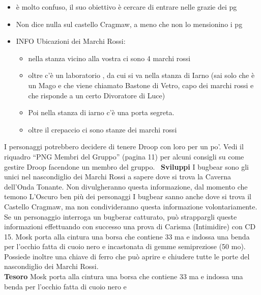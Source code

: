 \documentclass{article}
\begin{document}
        \begin{itemize}
            \item è molto confuso, il suo obiettivo è cercare di entrare nelle grazie dei pg
            \item Non dice nulla sul castello Cragmaw, a meno che non lo mensionino i pg
            \item INFO Ubicazioni dei Marchi Rossi: 
                    \begin{itemize}
                        \item nella stanza vicino alla vostra ci sono 4 marchi rossi
                        \item oltre c'è un laboratorio , da cui si va nella stanza di Iarno (sai solo che è un Mago e che viene chiamato Bastone di Vetro, capo dei marchi rossi e che risponde a un certo Divoratore di Luce)
                        \item Poi nella stanza di iarno c'è una porta segreta.
                        \item oltre il crepaccio ci sono stanze dei marchi rossi

                    \end{itemize} 
        \end{itemize}
        I personaggi potrebbero decidere di tenere Droop con
        loro per un po’. Vedi il riquadro “PNG Membri del Gruppo”
        (pagina 11) per alcuni consigli su come gestire Droop
        facendone un membro del gruppo.
        \
        \textbf{Sviluppi} I bugbear sono gli unici nel nascondiglio dei Marchi Rossi
        a sapere dove si trova la Caverna dell’Onda Tonante. Non
        divulgheranno questa informazione, dal momento che temono
        L'Oscuro ben più dei personaggi
        I bugbear sanno anche dove si trova il Castello Cragmaw,
        ma non condivideranno questa informazione volontariamente.
        Se un personaggio interroga un bugberar catturato, può
        strappargli queste informazioni effettuando con successo una
        prova di Carisma (Intimidire) con CD 15.
        Mosk porta alla cintura una borsa che contiene 33 ma
        e indossa una benda per l’occhio fatta di cuoio nero e
        incastonata di gemme semipreziose (50 mo). Possiede inoltre
        una chiave di ferro che può aprire e chiudere tutte le porte del
        nascondiglio dei Marchi Rossi.\\
        \textbf{Tesoro}
        Mosk porta alla cintura una borsa che contiene 33 ma
        e indossa una benda per l’occhio fatta di cuoio nero e
\end{document}
